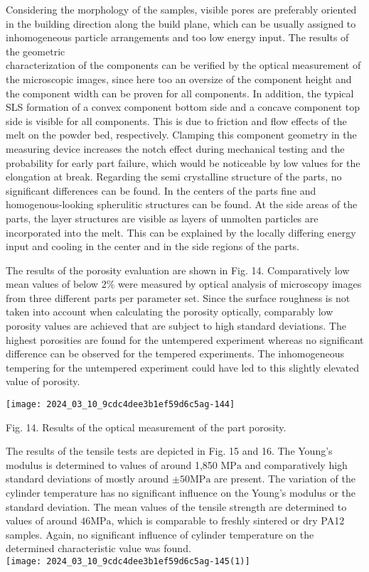 \documentclass[10pt]{article}
\begin{document}
Considering the morphology of the samples, visible pores are preferably oriented in the building direction along the build plane, which can be usually assigned to inhomogeneous particle arrangements and too low energy input. The results of the geometric\\
characterization of the components can be verified by the optical measurement of the microscopic images, since here too an oversize of the component height and the component width can be proven for all components. In addition, the typical SLS formation of a convex component bottom side and a concave component top side is visible for all components. This is due to friction and flow effects of the melt on the powder bed, respectively. Clamping this component geometry in the measuring device increases the notch effect during mechanical testing and the probability for early part failure, which would be noticeable by low values for the elongation at break. Regarding the semi crystalline structure of the parts, no significant differences can be found. In the centers of the parts fine and homogenous-looking spherulitic structures can be found. At the side areas of the parts, the layer structures are visible as layers of unmolten particles are incorporated into the melt. This can be explained by the locally differing energy input and cooling in the center and in the side regions of the parts.

The results of the porosity evaluation are shown in Fig. 14. Comparatively low mean values of below $2 \%$ were measured by optical analysis of microscopy images from three different parts per parameter set. Since the surface roughness is not taken into account when calculating the porosity optically, comparably low porosity values are achieved that are subject to high standard deviations. The highest porosities are found for the untempered experiment whereas no significant difference can be observed for the tempered experiments. The inhomogeneous tempering for the untempered experiment could have led to this slightly elevated value of porosity.

\begin{center}
\texttt{[image: 2024\_03\_10\_9cdc4dee3b1ef59d6c5ag-144]}
\end{center}

Fig. 14. Results of the optical measurement of the part porosity.

The results of the tensile tests are depicted in Fig. 15 and 16. The Young's modulus is determined to values of around 1,850 $\mathrm{MPa}$ and comparatively high standard deviations of mostly around $\pm 50 \mathrm{MPa}$ are present. The variation of the cylinder temperature has no significant influence on the Young's modulus or the standard deviation. The mean values of the tensile strength are determined to values of around $46 \mathrm{MPa}$, which is comparable to freshly sintered or dry PA12 samples. Again, no significant influence of cylinder temperature on the determined characteristic value was found.\\
\texttt{[image: 2024\_03\_10\_9cdc4dee3b1ef59d6c5ag-145(1)]}
\end{document}
